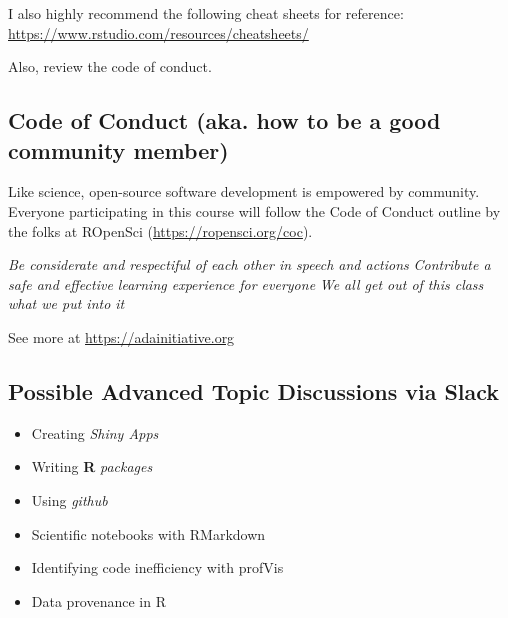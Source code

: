 \documentclass[11pt,]{article}
\providecommand{\tightlist}{%
  \setlength{\itemsep}{0pt}\setlength{\parskip}{0pt}}
\begin{document}
I also highly recommend the following cheat sheets for reference:
\url{https://www.rstudio.com/resources/cheatsheets/}

Also, review the code of conduct.

\hypertarget{code-of-conduct-aka.-how-to-be-a-good-community-member}{%
\subsection{Code of Conduct (aka. how to be a good community
member)}\label{code-of-conduct-aka.-how-to-be-a-good-community-member}}

Like science, open-source software development is empowered by
community. Everyone participating in this course will follow the Code of
Conduct outline by the folks at ROpenSci
(\url{https://ropensci.org/coc}).

\emph{Be considerate and respectiful of each other in speech and
actions} \emph{Contribute a safe and effective learning experience for
everyone} \emph{We all get out of this class what we put into it}

See more at \url{https://adainitiative.org}

\hypertarget{possible-advanced-topic-discussions-via-slack}{%
\subsection{Possible Advanced Topic Discussions via
Slack}\label{possible-advanced-topic-discussions-via-slack}}

\begin{itemize}
\tightlist
\item
  Creating \emph{Shiny Apps}
\item
  Writing \textbf{R} \emph{packages}
\item
  Using \emph{github}
\item
  Scientific notebooks with RMarkdown
\item
  Identifying code inefficiency with profVis
\item
  Data provenance in R
\end{itemize}
\end{document}
